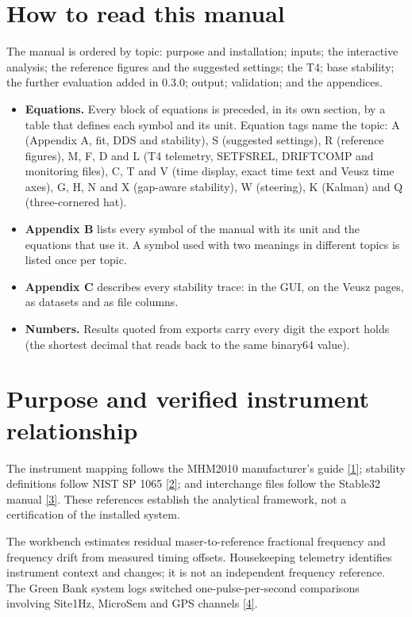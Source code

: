 \documentclass[11pt,a4paper]{article}
\newcommand{\manual}{\href{https://www.gb.nrao.edu/~fghigo/timer/MSMmaser/Maser_UG_75666-201_Rev_J.PDF}{[1]}}
\newcommand{\nist}{\href{https://tf.nist.gov/general/pdf/2220.pdf}{[2]}}
\newcommand{\stablemanual}{\href{http://www.stable32.com/Manual154.pdf}{[3]}}
\newcommand{\siteclock}{\href{https://www.gb.nrao.edu/~fghigo/timer/time_logging.html}{[4]}}
\renewcommand{\_}{\usscore\allowbreak}
\begin{document}
\section{How to read this manual}
The manual is ordered by topic: purpose and installation; inputs; the interactive analysis;
the reference figures and the suggested settings; the T4; base stability; the further
evaluation added in 0.3.0; output; validation; and the appendices.
\begin{itemize}
\item \textbf{Equations.} Every block of equations is preceded, in its own section, by a
table that defines each symbol and its unit. Equation tags name the topic: A (Appendix A,
fit, DDS and stability), S (suggested settings), R (reference figures), M, F, D and L
(T4 telemetry, SETFSREL, DRIFTCOMP and monitoring files), C, T and V (time display,
exact time text and Veusz time axes), G, H, N and X (gap-aware stability), W
(steering), K (Kalman) and Q (three-cornered hat).
\item \textbf{Appendix B} lists every symbol of the manual with its unit and the
equations that use it. A symbol used with two meanings in different topics is listed once
per topic.
\item \textbf{Appendix C} describes every stability trace: in the GUI, on the Veusz pages,
as datasets and as file columns.
\item \textbf{Numbers.} Results quoted from exports carry every digit the export holds
(the shortest decimal that reads back to the same binary64 value).
\end{itemize}

\section{Purpose and verified instrument relationship}
The instrument mapping follows the MHM2010 manufacturer's guide \manual;
stability definitions follow NIST SP 1065 \nist; and interchange files follow
the Stable32 manual \stablemanual. These references establish the analytical
framework, not a certification of the installed system.

The workbench estimates residual maser-to-reference fractional frequency and
frequency drift from measured timing offsets. Housekeeping telemetry identifies
instrument context and changes; it is not an independent frequency reference.
The Green Bank system logs switched one-pulse-per-second comparisons involving
Site1Hz, MicroSem and GPS channels \siteclock.
\end{document}
